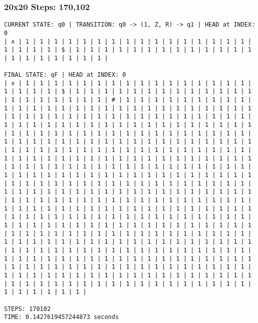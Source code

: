 \documentclass[a4paper,12pt]{article}
\begin{document}
\subsubsection{20x20 \textbar Steps: 170,102}
\begin{lstlisting}
CURRENT STATE: q0 | TRANSITION: q0 -> (1, Z, R) -> q1 | HEAD at INDEX: 0
| ∧ | 1 | 1 | 1 | 1 | 1 | 1 | 1 | 1 | 1 | 1 | 1 | 1 | 1 | 1 | 1 | 1 | 1 | 1 | 1 | 1 | $ | 1 | 1 | 1 | 1 | 1 | 1 | 1 | 1 | 1 | 1 | 1 | 1 | 1 | 1 | 1 | 1 | 1 | 1 | 1 | 1 |

FINAL STATE: qF | HEAD at INDEX: 0
| ∧ | 1 | 1 | 1 | 1 | 1 | 1 | 1 | 1 | 1 | 1 | 1 | 1 | 1 | 1 | 1 | 1 | 1 | 1 | 1 | 1 | $ | 1 | 1 | 1 | 1 | 1 | 1 | 1 | 1 | 1 | 1 | 1 | 1 | 1 | 1 | 1 | 1 | 1 | 1 | 1 | 1 | # | 1 | 1 | 1 | 1 | 1 | 1 | 1 | 1 | 1 | 1 | 1 | 1 | 1 | 1 | 1 | 1 | 1 | 1 | 1 | 1 | 1 | 1 | 1 | 1 | 1 | 1 | 1 | 1 | 1 | 1 | 1 | 1 | 1 | 1 | 1 | 1 | 1 | 1 | 1 | 1 | 1 | 1 | 1 | 1 | 1 | 1 | 1 | 1 | 1 | 1 | 1 | 1 | 1 | 1 | 1 | 1 | 1 | 1 | 1 | 1 | 1 | 1 | 1 | 1 | 1 | 1 | 1 | 1 | 1 | 1 | 1 | 1 | 1 | 1 | 1 | 1 | 1 | 1 | 1 | 1 | 1 | 1 | 1 | 1 | 1 | 1 | 1 | 1 | 1 | 1 | 1 | 1 | 1 | 1 | 1 | 1 | 1 | 1 | 1 | 1 | 1 | 1 | 1 | 1 | 1 | 1 | 1 | 1 | 1 | 1 | 1 | 1 | 1 | 1 | 1 | 1 | 1 | 1 | 1 | 1 | 1 | 1 | 1 | 1 | 1 | 1 | 1 | 1 | 1 | 1 | 1 | 1 | 1 | 1 | 1 | 1 | 1 | 1 | 1 | 1 | 1 | 1 | 1 | 1 | 1 | 1 | 1 | 1 | 1 | 1 | 1 | 1 | 1 | 1 | 1 | 1 | 1 | 1 | 1 | 1 | 1 | 1 | 1 | 1 | 1 | 1 | 1 | 1 | 1 | 1 | 1 | 1 | 1 | 1 | 1 | 1 | 1 | 1 | 1 | 1 | 1 | 1 | 1 | 1 | 1 | 1 | 1 | 1 | 1 | 1 | 1 | 1 | 1 | 1 | 1 | 1 | 1 | 1 | 1 | 1 | 1 | 1 | 1 | 1 | 1 | 1 | 1 | 1 | 1 | 1 | 1 | 1 | 1 | 1 | 1 | 1 | 1 | 1 | 1 | 1 | 1 | 1 | 1 | 1 | 1 | 1 | 1 | 1 | 1 | 1 | 1 | 1 | 1 | 1 | 1 | 1 | 1 | 1 | 1 | 1 | 1 | 1 | 1 | 1 | 1 | 1 | 1 | 1 | 1 | 1 | 1 | 1 | 1 | 1 | 1 | 1 | 1 | 1 | 1 | 1 | 1 | 1 | 1 | 1 | 1 | 1 | 1 | 1 | 1 | 1 | 1 | 1 | 1 | 1 | 1 | 1 | 1 | 1 | 1 | 1 | 1 | 1 | 1 | 1 | 1 | 1 | 1 | 1 | 1 | 1 | 1 | 1 | 1 | 1 | 1 | 1 | 1 | 1 | 1 | 1 | 1 | 1 | 1 | 1 | 1 | 1 | 1 | 1 | 1 | 1 | 1 | 1 | 1 | 1 | 1 | 1 | 1 | 1 | 1 | 1 | 1 | 1 | 1 | 1 | 1 | 1 | 1 | 1 | 1 | 1 | 1 | 1 | 1 | 1 | 1 | 1 | 1 | 1 | 1 | 1 | 1 | 1 | 1 | 1 | 1 | 1 | 1 | 1 | 1 | 1 | 1 | 1 | 1 | 1 | 1 | 1 | 1 | 1 | 1 | 1 | 1 | 1 | 1 | 1 | 1 | 1 | 1 | 1 | 1 | 1 | 1 | 1 | 1 | 1 | 1 | 1 | 1 | 1 | 1 | 1 | 1 | 1 | 1 | 1 | 1 | 1 | 1 | 1 | 1 | 1 | 1 | 1 | 1 | 1 | 1 | 1 | 1 | 1 | 1 | 1 |

STEPS: 170102
TIME: 0.1427619457244873 seconds

\end{lstlisting}
\end{document}

